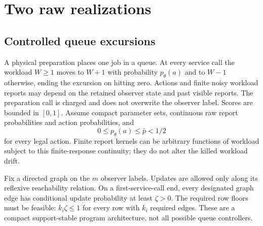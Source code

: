 \section{Two raw realizations}\label{sec:realizations}
\subsection{Controlled queue excursions}
A physical preparation places one job in a queue. At every service call the workload $W\ge1$ moves to $W+1$ with probability $p_\theta(a)$ and to $W-1$ otherwise, ending the excursion on hitting zero. Actions and finite noisy workload reports may depend on the retained observer state and past visible reports. The preparation call is charged and does not overwrite the observer label. Scores are bounded in $[0,1]$. Assume compact parameter sets, continuous raw report probabilities and action probabilities, and
\begin{equation}\label{eq:queue-drift}
 0\le p_\theta(a)\le\bar p<1/2
\end{equation}
for every legal action. Finite report kernels can be arbitrary functions of workload subject to this finite-response continuity; they do not alter the killed workload drift.

Fix a directed graph on the $m$ observer labels. Updates are allowed only along its reflexive reachability relation. On a first-service-call end, every designated graph edge has conditional update probability at least $\zeta>0$. The required row floors must be feasible: $k_i\zeta\le1$ for every row with $k_i$ required edges. These are a compact support-stable program architecture, not all possible queue controllers.

